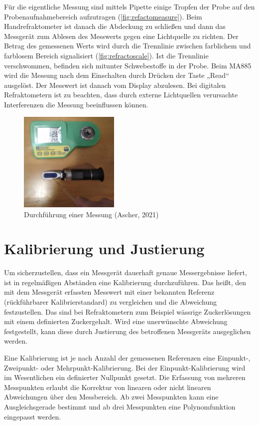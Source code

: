 \documentclass[a4paper,parskip=half]{scrartcl}
\begin{document}
Für die eigentliche Messung sind mittels Pipette einige Tropfen
der Probe auf den Probenaufnahmebereich aufzutragen
(\autoref{fig:refactomeasure}). Beim Handrefraktometer
ist danach die Abdeckung zu schließen und dann das Messgerät
zum Ablesen des Messwerts gegen eine Lichtquelle zu richten.
Der Betrag des gemessenen Werts wird durch die Trennlinie zwischen
farblichem und farblosem Bereich signalisiert (\autoref{fig:refractoscale}).
Ist die Trennlinie verschwommen, befinden sich mitunter Schwebestoffe
in der Probe. Beim MA885 wird die Messung nach
dem Einschalten durch Drücken der Taste „Read“ ausgelöst. Der
Messwert ist danach vom Display abzulesen. Bei digitalen
Refraktometern ist zu beachten, dass durch externe Lichtquellen
verursachte Interferenzen die Messung beeinflussen können.
\parencites{Gossett2012a}[50\psqq]{Terrill2013}

\begin{figure}[h]
\centering
\includegraphics[width=4.8cm]{images/measure.jpg}
\caption{Durchführung einer Messung (Ascher, 2021)}
\label{fig:refactomeasure}
\end{figure}

\section*{Kalibrierung und Justierung}

Um sicherzustellen, dass ein Messgerät dauerhaft genaue Messergebnisse
liefert, ist in regelmäßigen Abständen eine Kalibrierung durchzuführen.
Das heißt, den mit dem Messgerät erfassten Messwert mit einer bekannten
Referenz (rückführbarer Kalibrierstandard) zu vergleichen und die
Abweichung festzustellen. Das sind bei Refraktometern zum Beispiel
wässrige Zuckerlösungen mit einem definierten Zuckergehalt.
Wird eine unerwünschte Abweichung festgestellt, kann diese
durch Justierung des betroffenen Messgeräts ausgeglichen werden.

Eine Kalibrierung ist je nach Anzahl der gemessenen Referenzen
eine Einpunkt-, Zweipunkt- oder Mehrpunkt-Kalibrierung.
Bei der Einpunkt-Kalibrierung wird im Wesentlichen ein definierter
Nullpunkt gesetzt. Die Erfassung von mehreren Messpunkten erlaubt
die Korrektur von linearen oder nicht linearen Abweichungen
über den Messbereich. Ab zwei Messpunkten kann eine Ausgleichsgerade
bestimmt und ab drei Messpunkten eine Polynomfunktion eingepasst
werden. \parencite{Earl2015}
\end{document}
